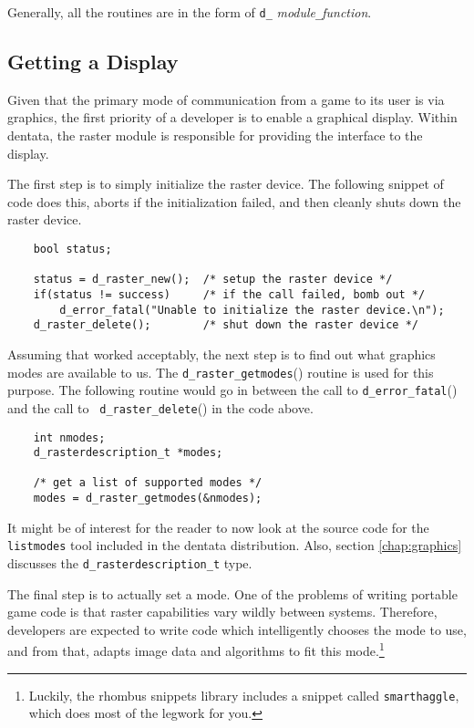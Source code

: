 Generally, all the routines are in the form of {\tt d\_}{\it
module}{\tt \_}{\it function}.

\subsection{Getting a Display}

Given that the primary mode of communication from a game to its
user is via graphics, the first priority of a developer is to
enable a graphical display. Within dentata, the raster module is
responsible for providing the interface to the display.

The first step is to simply initialize the raster device. The following
snippet of code does this, aborts if the initialization failed, and then
cleanly shuts down the raster device.

\begin{verbatim}
    bool status;

    status = d_raster_new();  /* setup the raster device */
    if(status != success)     /* if the call failed, bomb out */
        d_error_fatal("Unable to initialize the raster device.\n");
    d_raster_delete();        /* shut down the raster device */
\end{verbatim}

Assuming that worked acceptably, the next step is to find out what
graphics modes are available to us. The {\tt d\_raster\_getmodes}()
routine is used for this purpose. The following routine would go in
between the call to {\tt d\_error\_fatal}() and the call to {\tt
d\_raster\_delete}() in the code above.

\begin{verbatim}
    int nmodes;
    d_rasterdescription_t *modes;

    /* get a list of supported modes */
    modes = d_raster_getmodes(&nmodes);
\end{verbatim}

It might be of interest for the reader to now look at the source code for
the {\tt listmodes} tool included in the dentata distribution. Also,
section \ref{chap:graphics} discusses the {\tt d\_rasterdescription\_t}
type.

The final step is to actually set a mode. One of the problems of
writing portable game code is that raster capabilities vary wildly
between systems. Therefore, developers are expected to write code
which intelligently chooses the mode to use, and from that, adapts
image data and algorithms to fit this mode.\footnote{Luckily, the rhombus
snippets library includes a snippet called {\tt smarthaggle}, which does
most of the legwork for you.}


